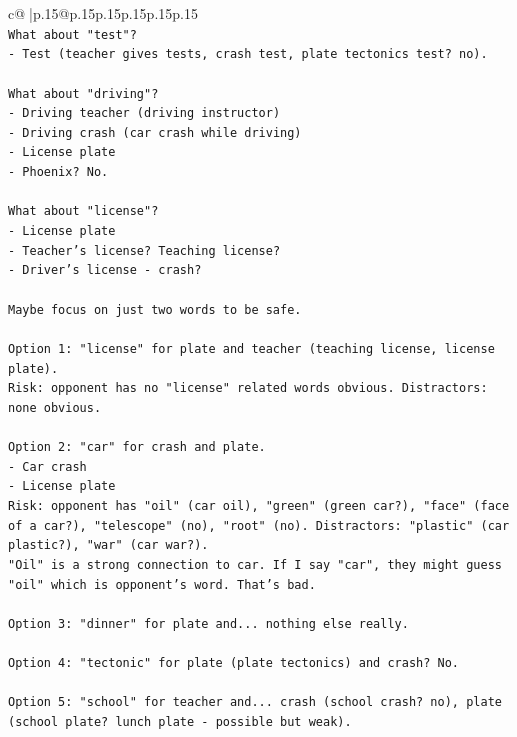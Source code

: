 \documentclass{article}
\begin{document}
{\begin{supertabular}{c@{$\;$}|p{.15\linewidth}@{}p{.15\linewidth}p{.15\linewidth}p{.15\linewidth}p{.15\linewidth}p{.15\linewidth}}
{{{\\ 
\texttt{What about "test"?} \\
\texttt{{-} Test (teacher gives tests, crash test, plate tectonics test? no).} \\
\\ 
\texttt{What about "driving"?} \\
\texttt{{-} Driving teacher (driving instructor)} \\
\texttt{{-} Driving crash (car crash while driving)} \\
\texttt{{-} License plate} \\
\texttt{{-} Phoenix? No.} \\
\\ 
\texttt{What about "license"?} \\
\texttt{{-} License plate} \\
\texttt{{-} Teacher's license? Teaching license?} \\
\texttt{{-} Driver's license {-} crash?} \\
\\ 
\texttt{Maybe focus on just two words to be safe.} \\
\\ 
\texttt{Option 1: "license" for plate and teacher (teaching license, license plate).} \\
\texttt{Risk: opponent has no "license" related words obvious. Distractors: none obvious.} \\
\\ 
\texttt{Option 2: "car" for crash and plate.} \\
\texttt{{-} Car crash} \\
\texttt{{-} License plate} \\
\texttt{Risk: opponent has "oil" (car oil), "green" (green car?), "face" (face of a car?), "telescope" (no), "root" (no). Distractors: "plastic" (car plastic?), "war" (car war?).} \\
\texttt{"Oil" is a strong connection to car. If I say "car", they might guess "oil" which is opponent's word. That's bad.} \\
\\ 
\texttt{Option 3: "dinner" for plate and... nothing else really.} \\
\\ 
\texttt{Option 4: "tectonic" for plate (plate tectonics) and crash? No.} \\
\\ 
\texttt{Option 5: "school" for teacher and... crash (school crash? no), plate (school plate? lunch plate {-} possible but weak).} \\
}}}
\end{supertabular}}
\end{document}
